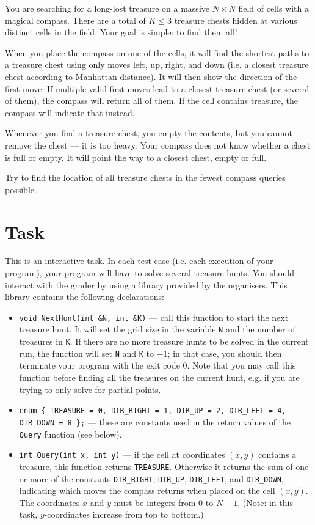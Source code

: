 
You are searching for a long-lost treasure on a massive $N \times N$ field of
cells with a magical compass. There are a total of $K \leq 3$ treasure chests
hidden at various distinct cells in the field. Your goal is simple: to find them
all!

When you place the compass on one of the cells, it will find the shortest paths
to a treasure chest using only moves left, up, right, and down (i.e. a closest
treasure chest according to Manhattan distance). It will then show the direction
of the first move. If multiple valid first moves lead to a closest treasure chest
(or several of them), the compass will return all of them. If the cell contains
treasure, the compass will indicate that instead.

Whenever you find a treasure chest, you empty the contents, but you cannot remove
the chest --- it is too heavy. Your compass does not know whether a chest is full
or empty. It will point the way to a closest chest, empty or full.

Try to find the location of all treasure chests in the fewest compass queries
possible.

\section*{Task}
This is an interactive task. In each test case (i.e. each execution of your
program), your program will have to solve several treasure hunts. You should
interact with the grader by using a library provided by the organisers. This
library contains the following declarations:

\begin{itemize}
  \item \texttt{void NextHunt(int \&N, int \&K)} --- call this function to start
        the next treasure hunt. It will set the grid size in the variable
        \texttt{N} and the number of treasures in \texttt{K}. If there are no
        more treasure hunts to be solved in the current run, the function will
        set \texttt{N} and \texttt{K} to $-1$; in that case, you should then
        terminate your program with the exit code $0$. Note that you may call
        this function before finding all the treasures on the current hunt, e.g.
        if you are trying to only solve for partial points.
  \item \texttt{enum \{ TREASURE = 0, DIR\_RIGHT = 1, DIR\_UP = 2, DIR\_LEFT = 4,
        DIR\_DOWN = 8 \};} --- these are constants used in the return values of
        the \texttt{Query} function (see below).
  \item \texttt{int Query(int x, int y)} --- if the cell at coordinates $(x, y)$
        contains a treasure, this function returns \texttt{TREASURE}. Otherwise
        it returns the sum of one or more of the constants \texttt{DIR\_RIGHT},
        \texttt{DIR\_UP}, \texttt{DIR\_LEFT}, and \texttt{DIR\_DOWN}, indicating
        which moves the compass returns when placed on the cell $(x, y)$. The
        coordinates $x$ and $y$ must be integers from $0$ to $N-1$. (Note: in
        this task, $y$-coordinates increase from top to bottom.)
\end{itemize}

